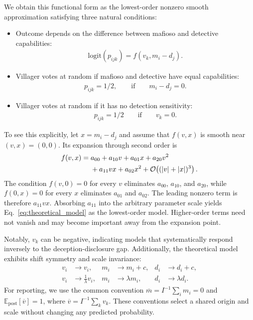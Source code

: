 \documentclass[sigconf,anonymous,balance=false]{aamas}
\begin{document}
We obtain this functional form as the lowest-order nonzero smooth approximation satisfying three natural conditions:
\begin{itemize}
    \item Outcome depends on the difference between mafioso and detective capabilities:
    \begin{align}
        \text{logit}(p_{ijk})=f(v_k,m_i-d_j).
        \label{eq:assumption_f}
    \end{align}
    \item Villager votes at random if mafioso and detective have equal capabilities:
    \begin{align}
        p_{ijk}=1/2,\qquad\text{if} \qquad m_i-d_j=0.
        \label{eq:assumption_md0}
    \end{align}
    \item Villager votes at random if it has no detection sensitivity:
    \begin{align}
        p_{ijk}=1/2\qquad\text{if}\qquad v_k=0.
        \label{eq:assumption_v0}
    \end{align}
\end{itemize}
To see this explicitly, let $x=m_i-d_j$ and assume that $f(v,x)$ is smooth near $(v,x)=(0,0)$. Its expansion through second order is
\begin{align}
    f(v,x) ={}& a_{00}+a_{10}v+a_{01}x+a_{20}v^2 \notag\\
              &{}+a_{11}vx+a_{02}x^2
              +\mathcal{O}\!\left((|v|+|x|)^3\right).
    \label{eq:taylor_model}
\end{align}
The condition $f(v,0)=0$ for every $v$ eliminates $a_{00}$, $a_{10}$, and $a_{20}$, while $f(0,x)=0$ for every $x$ eliminates $a_{01}$ and $a_{02}$. The leading nonzero term is therefore $a_{11}vx$. Absorbing $a_{11}$ into the arbitrary parameter scale yields Eq.~\eqref{eq:theoretical_model} as the lowest-order model. Higher-order terms need not vanish and may become important away from the expansion point.

Notably, $v_k$ can be negative, indicating models that systematically respond inversely to the deception-disclosure gap. Additionally, the theoretical model exhibits shift symmetry and scale invariance:
\begin{align}
    v_i &\rightarrow v_i, & m_i &\rightarrow m_i + c, & d_i &\rightarrow d_i + c,
    \label{eq:shift_symmetry} \\
    v_i &\rightarrow \frac{1}{\lambda} v_i, & m_i &\rightarrow \lambda m_i, & d_i &\rightarrow \lambda d_i. \label{eq:scaling_invariance}
\end{align}
For reporting, we use the common convention $\overline{m}=I^{-1}\sum_i m_i=0$ and $\mathbb{E}_{\mathrm{post}}[\overline{v}]=1$, where $\overline{v}=I^{-1}\sum_k v_k$. These conventions select a shared origin and scale without changing any predicted probability.
\end{document}
